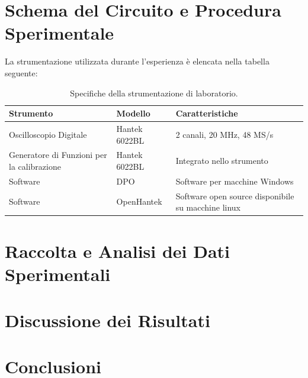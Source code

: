 \documentclass{article}
\begin{document}
\newpage

\section{Schema del Circuito e Procedura Sperimentale}
La strumentazione utilizzata durante l'esperienza è elencata nella tabella seguente:

\begin{table}[H]
\centering
\begin{tabularx}{\textwidth}{|X|X|X|}
\hline
\textbf{Strumento} & \textbf{Modello} & \textbf{Caratteristiche} \\ \hline
Oscilloscopio Digitale & Hantek 6022BL & 2 canali, 20 MHz, 48 MS/s \\ \hline
Generatore di Funzioni per la calibrazione & Hantek 6022BL & Integrato nello strumento \\ \hline
Software & DPO & Software per macchine Windows \\ \hline
Software & OpenHantek & Software open source disponibile su macchine linux \\ \hline
\end{tabularx}
\caption{Specifiche della strumentazione di laboratorio.}
\end{table}
\newpage

\section{Raccolta e Analisi dei Dati Sperimentali}

\newpage

\section{Discussione dei Risultati}
\newpage

\section{Conclusioni}
\newpage
\end{document}
